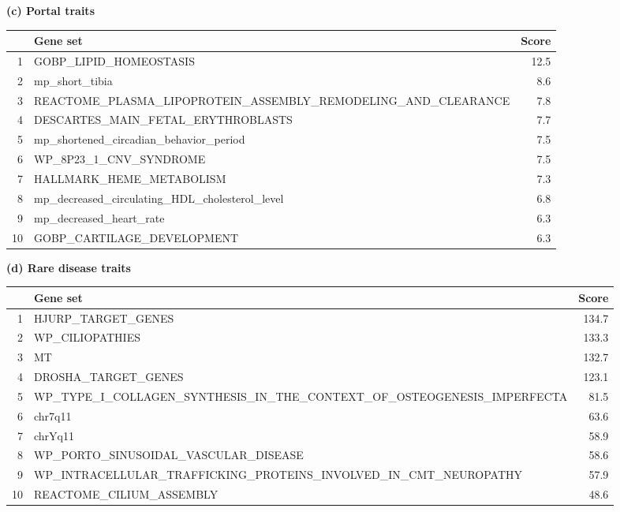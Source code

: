 \begin{table}[t!]
\vspace{8pt}
\textbf{(c) Portal traits}\\[2pt]
\begin{tabular}{@{} r l r @{}}
\toprule
 & \textbf{Gene set} & \textbf{Score} \\
\midrule
1 & GOBP\_LIPID\_HOMEOSTASIS & 12.5 \\
2 & mp\_short\_tibia & 8.6 \\
3 & REACTOME\_PLASMA\_LIPOPROTEIN\_ASSEMBLY\_REMODELING\_AND\_CLEARANCE & 7.8 \\
4 & DESCARTES\_MAIN\_FETAL\_ERYTHROBLASTS & 7.7 \\
5 & mp\_shortened\_circadian\_behavior\_period & 7.5 \\
6 & WP\_8P23\_1\_CNV\_SYNDROME & 7.5 \\
7 & HALLMARK\_HEME\_METABOLISM & 7.3 \\
8 & mp\_decreased\_circulating\_HDL\_cholesterol\_level & 6.8 \\
9 & mp\_decreased\_heart\_rate & 6.3 \\
10 & GOBP\_CARTILAGE\_DEVELOPMENT & 6.3 \\
\bottomrule
\end{tabular}

\vspace{8pt}
\textbf{(d) Rare disease traits}\\[2pt]
\begin{tabular}{@{} r l r @{}}
\toprule
 & \textbf{Gene set} & \textbf{Score} \\
\midrule
1 & HJURP\_TARGET\_GENES & 134.7 \\
2 & WP\_CILIOPATHIES & 133.3 \\
3 & MT & 132.7 \\
4 & DROSHA\_TARGET\_GENES & 123.1 \\
5 & WP\_TYPE\_I\_COLLAGEN\_SYNTHESIS\_IN\_THE\_CONTEXT\_OF\_OSTEOGENESIS\_IMPERFECTA & 81.5 \\
6 & chr7q11 & 63.6 \\
7 & chrYq11 & 58.9 \\
8 & WP\_PORTO\_SINUSOIDAL\_VASCULAR\_DISEASE & 58.6 \\
9 & WP\_INTRACELLULAR\_TRAFFICKING\_PROTEINS\_INVOLVED\_IN\_CMT\_NEUROPATHY & 57.9 \\
10 & REACTOME\_CILIUM\_ASSEMBLY & 48.6 \\
\bottomrule
\end{tabular}

\end{table}
